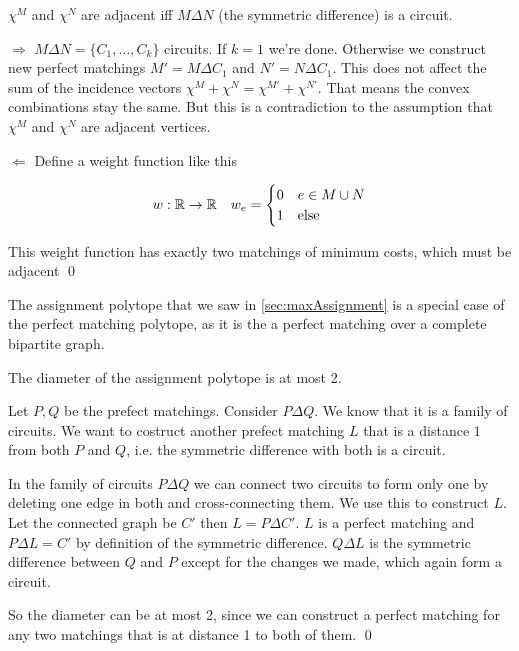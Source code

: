 \begin{lem} $\chi^M$ and $\chi^N$ are adjacent iff $M\Delta N$ (the symmetric difference) is a circuit.\end{lem}

\begin{pr} $\Rightarrow$ $M\Delta N = \{C_1,\ldots, C_k\}$ circuits. If $k=1$ we're done. Otherwise we construct new perfect matchings $M'=M\Delta C_1$ and $N'=N\Delta C_1$. This does not affect the sum of the incidence vectors $\chi^M+\chi^N=\chi^{M'} +\chi^{N'}$. That means the convex combinations stay the same. But this is a contradiction to the assumption that $\chi^M$ and $\chi^N$ are adjacent vertices.

$\Leftarrow$ Define a weight function like this

\[w:\mathbb{R} \rightarrow \mathbb{R} \quad w_e=\begin{cases}0 & e\in M\cup N\\ 1 &\text{else}\end{cases}\]

This weight function has exactly two matchings of minimum costs, which must be adjacent
\qed \end{pr}

The assignment polytope that we saw in \ref{sec:maxAssignment} is a special case of the perfect matching polytope, as it is the a perfect matching over a complete bipartite graph.

\begin{lem} The diameter of the assignment polytope is at most 2. \end{lem}

\begin{pr} Let $P,Q$ be the prefect matchings. Consider $P\Delta Q$. We know that it is a family of circuits. We want to costruct another prefect matching $L$ that is a distance $1$ from both $P$ and $Q$, i.e. the symmetric difference with both is a circuit.

In the family of circuits $P\Delta Q$ we can connect two circuits to form only one by deleting one edge in both and cross-connecting them. We use this to construct $L$. Let the connected graph be $C'$ then $L=P\Delta C'$. $L$ is a perfect matching and $P\Delta L=C'$ by definition of the symmetric difference. $Q\Delta L$ is the symmetric difference between $Q$ and $P$ except for the changes we made, which again form a circuit.

So the diameter can be at most 2, since we can construct a perfect matching for any two matchings that is at distance 1 to both of them.
\qed \end{pr}

